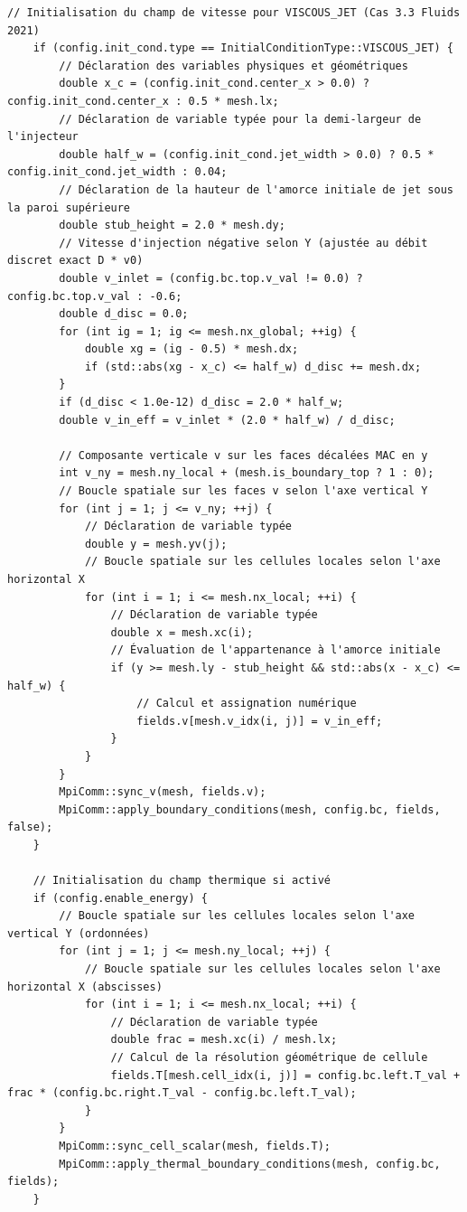 \documentclass[10pt,a4paper,oneside]{book}
\begin{document}
\begin{lstlisting}[language={[11]C++}]
    // Initialisation du champ de vitesse pour VISCOUS_JET (Cas 3.3 Fluids 2021)
    if (config.init_cond.type == InitialConditionType::VISCOUS_JET) {
        // Déclaration des variables physiques et géométriques
        double x_c = (config.init_cond.center_x > 0.0) ? config.init_cond.center_x : 0.5 * mesh.lx;
        // Déclaration de variable typée pour la demi-largeur de l'injecteur
        double half_w = (config.init_cond.jet_width > 0.0) ? 0.5 * config.init_cond.jet_width : 0.04;
        // Déclaration de la hauteur de l'amorce initiale de jet sous la paroi supérieure
        double stub_height = 2.0 * mesh.dy;
        // Vitesse d'injection négative selon Y (ajustée au débit discret exact D * v0)
        double v_inlet = (config.bc.top.v_val != 0.0) ? config.bc.top.v_val : -0.6;
        double d_disc = 0.0;
        for (int ig = 1; ig <= mesh.nx_global; ++ig) {
            double xg = (ig - 0.5) * mesh.dx;
            if (std::abs(xg - x_c) <= half_w) d_disc += mesh.dx;
        }
        if (d_disc < 1.0e-12) d_disc = 2.0 * half_w;
        double v_in_eff = v_inlet * (2.0 * half_w) / d_disc;

        // Composante verticale v sur les faces décalées MAC en y
        int v_ny = mesh.ny_local + (mesh.is_boundary_top ? 1 : 0);
        // Boucle spatiale sur les faces v selon l'axe vertical Y
        for (int j = 1; j <= v_ny; ++j) {
            // Déclaration de variable typée
            double y = mesh.yv(j);
            // Boucle spatiale sur les cellules locales selon l'axe horizontal X
            for (int i = 1; i <= mesh.nx_local; ++i) {
                // Déclaration de variable typée
                double x = mesh.xc(i);
                // Évaluation de l'appartenance à l'amorce initiale
                if (y >= mesh.ly - stub_height && std::abs(x - x_c) <= half_w) {
                    // Calcul et assignation numérique
                    fields.v[mesh.v_idx(i, j)] = v_in_eff;
                }
            }
        }
        MpiComm::sync_v(mesh, fields.v);
        MpiComm::apply_boundary_conditions(mesh, config.bc, fields, false);
    }

    // Initialisation du champ thermique si activé
    if (config.enable_energy) {
        // Boucle spatiale sur les cellules locales selon l'axe vertical Y (ordonnées)
        for (int j = 1; j <= mesh.ny_local; ++j) {
            // Boucle spatiale sur les cellules locales selon l'axe horizontal X (abscisses)
            for (int i = 1; i <= mesh.nx_local; ++i) {
                // Déclaration de variable typée
                double frac = mesh.xc(i) / mesh.lx;
                // Calcul de la résolution géométrique de cellule
                fields.T[mesh.cell_idx(i, j)] = config.bc.left.T_val + frac * (config.bc.right.T_val - config.bc.left.T_val);
            }
        }
        MpiComm::sync_cell_scalar(mesh, fields.T);
        MpiComm::apply_thermal_boundary_conditions(mesh, config.bc, fields);
    }


\end{lstlisting}
\end{document}
